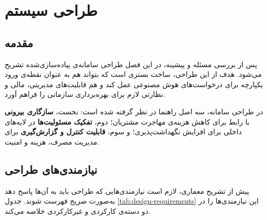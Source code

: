 \chapter{طراحی سیستم}
\label{ch:design}

\section{مقدمه}

پس از بررسی مسئله و پیشینه، در این فصل طراحی سامانه‌ی پیاده‌سازی‌شده
تشریح می‌شود. هدف از این طراحی، ساخت بستری است که بتواند هم به عنوان
نقطه‌ی ورود یکپارچه برای درخواست‌های هوش مصنوعی عمل کند و هم قابلیت‌های
مدیریتی، مالی و نظارتی لازم برای بهره‌برداری سازمانی را فراهم آورد.

در طراحی سامانه، سه اصل راهنما در نظر گرفته شده است: نخست،
\textbf{سازگاری بیرونی} با رابط  برای کاهش هزینه‌ی مهاجرت
مشتریان؛ دوم، \textbf{تفکیک مسئولیت‌ها} در لایه‌های داخلی برای افزایش
نگهداشت‌پذیری؛ و سوم، \textbf{قابلیت کنترل و گزارش‌گیری} برای مدیریت
مصرف، هزینه و امنیت.

\section{نیازمندی‌های طراحی}

پیش از تشریح معماری، لازم است نیازمندی‌هایی که طراحی باید به آن‌ها پاسخ
دهد به‌صورت صریح فهرست شوند. جدول \ref{tab:design-requirements} این
نیازمندی‌ها را در دو دسته‌ی کارکردی و غیرکارکردی خلاصه می‌کند.

